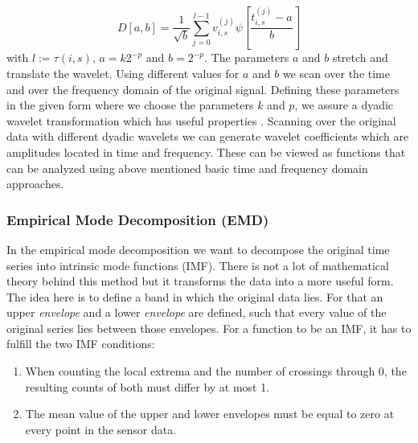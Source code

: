 \begin{equation}
	D[a,b] = \frac{1}{\sqrt{b}}\sum_{j=0}^{l-1} v_{i,s}^{(j)} \psi \left[ \frac{t_{i,s}^{(j)} - a}{b}\right]
\end{equation}
with $l := \tau(i,s)$, $a = k2^{-p}$ and $b = 2^{-p}$.
The parameters $a$ and $b$ stretch and translate the wavelet. Using different values for $a$ and $b$ we scan over the time and over the frequency domain of the original signal. Defining these parameters in the given form where we choose the parameters $k$ and $p$, we assure a dyadic wavelet transformation which has useful properties \cite{DBLP:journals/iet-spr/SangeethaH17}.
Scanning over the original data with different dyadic wavelets we can generate wavelet coefficients which are amplitudes located in time and frequency. These can be viewed as functions that can be analyzed using above mentioned basic time and frequency domain approaches.
\subsubsection{Empirical Mode Decomposition (EMD)}
In the empirical mode decomposition \cite{huang1998empirical} we want to decompose the original time series into intrinsic mode functions (IMF). There is not a lot of mathematical theory behind this method but it transforms the data into a more useful form. 
The idea here is to define a band in which the original data lies. For that an upper \textit{envelope} and a lower \textit{envelope} are defined, such that every value of the original series lies between those envelopes.
For a function to be an IMF, it has to fulfill the two IMF conditions: 
\begin{enumerate}
	\item When counting the  local extrema and the number of crossings through 0, the resulting counts of both must differ by at most 1.
	\item The mean value of the upper and lower envelopes must be equal to zero at every point in the sensor data.
\end{enumerate}

